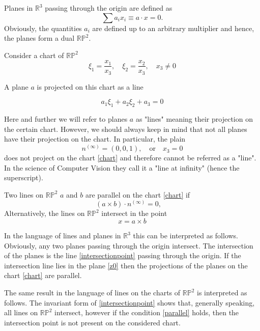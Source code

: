 \documentclass[a4paper,10pt]{article}
\begin{document}
Planes in $\mathbb{R}^3$ passing through the origin are defined as 
\begin{equation}
\sum a_i x_i \equiv a\cdot x= 0.
\end{equation}
 Obviously, the quantities $a_i$ are defined up to an arbitrary multiplier and hence, the planes form a dual $\mathbb{RP}^2$. 
 
 Consider a chart of $\mathbb{RP}^2$
 \begin{equation}
 \xi_1 = \frac{x_1}{x_3}, \quad \xi_2=\frac{x_2}{x_3}, \quad x_3\neq 0\label{chart}
 \end{equation}
 
A plane $a$ is projected on this chart as a line

\begin{equation}
a_1 \xi_1 + a_2 \xi_2 + a_3 = 0
\end{equation} 

Here and further we will refer to planes $a$ as "lines" meaning their projection on the certain chart. However, we should always keep in mind that not all planes have their projection on the chart. In particular, the plain 
\begin{equation}
n^{(\infty)} = (0,0,1), \quad \text{or} \quad x_3 = 0\label{z0}
\end{equation}
does not project on the chart \eqref{chart} and therefore cannot be referred as a "line". In the science of Computer Vision they call it a "line at infinity" (hence the superscript).

Two lines on $\mathbb{RP}^2$ $a$ and $b$ are parallel on the chart  \eqref{chart} if 
\begin{equation}
(a\times b )\cdot n^{(\infty)} = 0, \quad \label{parallel}
\end{equation}
Alternatively, the lines on $\mathbb{RP}^2$ intersect in the point 
\begin{equation}
x = a \times b\label{intersectionpoint}
\end{equation}

In the language of lines and planes in $\mathbb{R}^3$ this can be interpreted as follows. Obviously, any two planes passing through the origin intersect. The intersection of the planes is the line \eqref{intersectionpoint} passing through the origin. If the intersection line lies in the plane \eqref{z0} then the projections of the planes on the chart \eqref{chart} are parallel.

The same result in the language of lines on the charts of $\mathbb{RP}^2$ is interpreted as  follows. The invariant form of \eqref{intersectionpoint} shows that, generally speaking, all lines on $\mathbb{RP}^2$ intersect, however if the condition \eqref{parallel} holds, then the intersection point is not  present on the considered chart.
\end{document}
